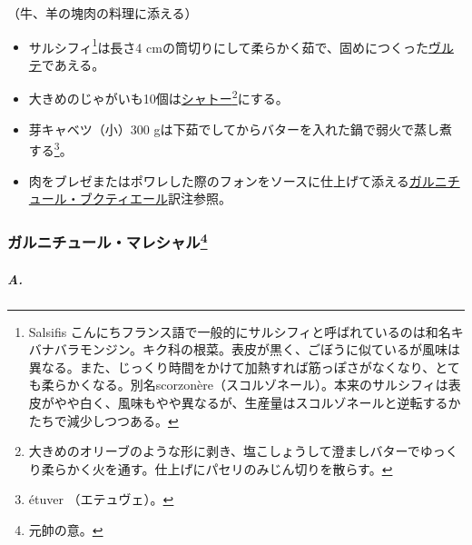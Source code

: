 \begin{recette}


（牛、羊の塊肉の料理に添える）

\begin{itemize}
\item
  サルシフィ\footnote{Salsifis
    こんにちフランス語で一般的にサルシフィと呼ばれているのは和名キバナバラモンジン。キク科の根菜。表皮が黒く、ごぼうに似ているが風味は異なる。また、じっくり時間をかけて加熱すれば筋っぽさがなくなり、とても柔らかくなる。別名scorzonère（スコルゾネール）。本来のサルシフィは表皮がやや白く、風味もやや異なるが、生産量はスコルゾネールと逆転するかたちで減少しつつある。}は長さ4
  cmの筒切りにして柔らかく茹で、固めにつくった\protect\hyperlink{veloute}{ヴルテ}であえる。
\item
  大きめのじゃがいも10個は\protect\hyperlink{pommes-de-terre-chateau}{シャトー}\footnote{大きめのオリーブのような形に剥き、塩こしょうして澄ましバターでゆっくり柔らかく火を通す。仕上げにパセリのみじん切りを散らす。}にする。
\item
  芽キャベツ（小）300
  gは下茹でしてからバターを入れた鍋で弱火で蒸し煮する\footnote{étuver
    （エテュヴェ）。}。
\item
  肉をブレゼまたはポワレした際のフォンをソースに仕上げて添える\protect\hyperlink{garniture-a-la-bouquetiere}{ガルニチュール・ブクティエール}訳注参照。
\end{itemize}

\hypertarget{garniture-marechal}{%
\subsubsection[ガルニチュール・マレシャル]{\texorpdfstring{ガルニチュール・マレシャル\footnote{元帥の意。}}{ガルニチュール・マレシャル}}\label{garniture-marechal}}



\hypertarget{a.}{%
\subparagraph{A.}\label{a.}}


\end{recette}
